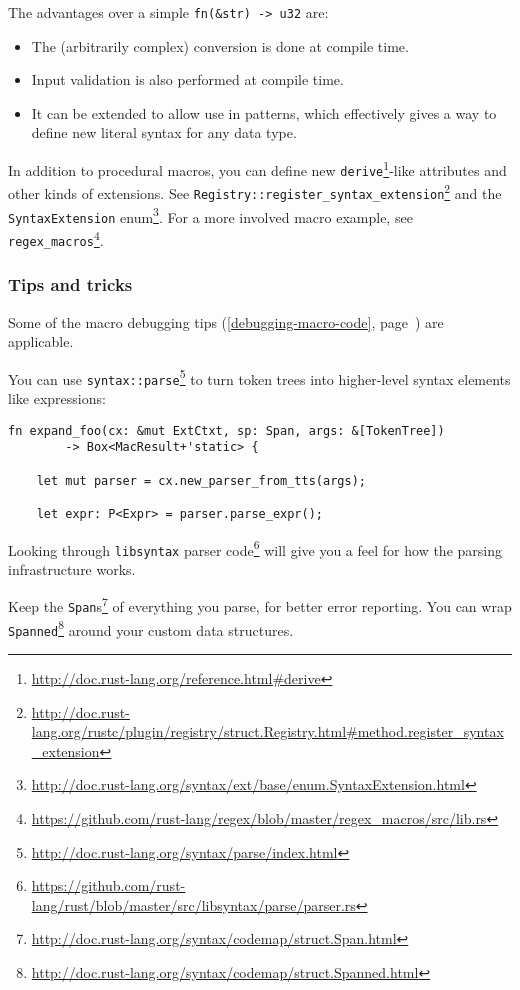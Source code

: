 \documentclass[a4paper,]{book}
\renewcommand*{\hyperref}[2][\ar]{%
  \def\ar{#2}%
  #2 (\autoref{#1}, page~\pageref{#1})}
\renewcommand{\href}[2]{#2\footnote{\url{#1}}}
\begin{document}
The advantages over a simple \texttt{fn(\&str)\ -\textgreater{}\ u32}
are:

\begin{itemize}
\itemsep1pt\parskip0pt
\item
  The (arbitrarily complex) conversion is done at compile time.
\item
  Input validation is also performed at compile time.
\item
  It can be extended to allow use in patterns, which effectively gives a
  way to define new literal syntax for any data type.
\end{itemize}

In addition to procedural macros, you can define new
\href{http://doc.rust-lang.org/reference.html\#derive}{\texttt{derive}}-like
attributes and other kinds of extensions. See
\href{http://doc.rust-lang.org/rustc/plugin/registry/struct.Registry.html\#method.register_syntax_extension}{\texttt{Registry::register\_syntax\_extension}}
and the
\href{http://doc.rust-lang.org/syntax/ext/base/enum.SyntaxExtension.html}{\texttt{SyntaxExtension}
enum}. For a more involved macro example, see
\href{https://github.com/rust-lang/regex/blob/master/regex_macros/src/lib.rs}{\texttt{regex\_macros}}.

\subsubsection{Tips and tricks}\label{tips-and-tricks}

Some of the \hyperref[debugging-macro-code]{macro debugging tips} are
applicable.

You can use
\href{http://doc.rust-lang.org/syntax/parse/index.html}{\texttt{syntax::parse}}
to turn token trees into higher-level syntax elements like expressions:

\begin{verbatim}
fn expand_foo(cx: &mut ExtCtxt, sp: Span, args: &[TokenTree])
        -> Box<MacResult+'static> {

    let mut parser = cx.new_parser_from_tts(args);

    let expr: P<Expr> = parser.parse_expr();
\end{verbatim}

Looking through
\href{https://github.com/rust-lang/rust/blob/master/src/libsyntax/parse/parser.rs}{\texttt{libsyntax}
parser code} will give you a feel for how the parsing infrastructure
works.

Keep the
\href{http://doc.rust-lang.org/syntax/codemap/struct.Span.html}{\texttt{Span}s}
of everything you parse, for better error reporting. You can wrap
\href{http://doc.rust-lang.org/syntax/codemap/struct.Spanned.html}{\texttt{Spanned}}
around your custom data structures.
\end{document}

